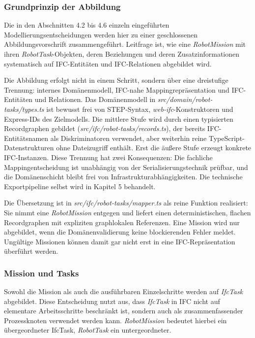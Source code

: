 \subsubsection{Grundprinzip der Abbildung}
Die in den Abschnitten 4.2 bis 4.6 einzeln eingeführten Modellierungsentscheidungen werden hier zu
einer geschlossenen Abbildungsvorschrift zusammengeführt. Leitfrage ist, wie eine
\textit{RobotMission} mit ihren \textit{RobotTask}-Objekten, deren Beziehungen und deren
Zusatzinformationen systematisch auf IFC-Entitäten und IFC-Relationen abgebildet wird.

Die Abbildung erfolgt nicht in einem Schritt, sondern über eine dreistufige Trennung: internes Domänenmodell, IFC-nahe Mappingrepräsentation und IFC-Entitäten und Relationen.
Das Domänenmodell in \textit{src/domain/robot-tasks/types.ts} ist bewusst frei von STEP-Syntax,
\textit{web-ifc}-Konstruktoren und Express-IDs des Zielmodells. Die mittlere Stufe wird durch einen
typisierten Recordgraphen gebildet (\textit{src/ifc/robot-tasks/records.ts}), der bereits
IFC-Entitätsnamen als Diskriminatoren verwendet, aber weiterhin reine TypeScript-Datenstrukturen
ohne Dateizugriff enthält. Erst die äußere Stufe erzeugt konkrete IFC-Instanzen. Diese Trennung hat
zwei Konsequenzen: Die fachliche Mappingentscheidung ist unabhängig von der Serialisierungstechnik
prüfbar, und die Domänenschicht bleibt frei von Infrastrukturabhängigkeiten. Die technische
Exportpipeline selbst wird in Kapitel 5 behandelt.

Die Übersetzung ist in \textit{src/ifc/robot-tasks/mapper.ts} als reine Funktion realisiert: Sie
nimmt eine \textit{RobotMission} entgegen und liefert einen deterministischen, flachen Recordgraphen
mit expliziten graphlokalen Referenzen. Eine Mission wird nur abgebildet, wenn die
Domänenvalidierung keine blockierenden Fehler meldet. Ungültige Missionen können damit gar nicht
erst in eine IFC-Repräsentation überführt werden.

\subsubsection{Mission und Tasks}
Sowohl die Mission als auch die ausführbaren Einzelschritte werden auf \textit{IfcTask} abgebildet.
Diese Entscheidung nutzt aus, dass \textit{IfcTask} in IFC nicht auf elementare Arbeitsschritte
beschränkt ist, sondern auch als zusammenfassender Prozessknoten verwendet werden kann.
\textit{RobotMission} bedeutet hierbei ein übergeordneter IfcTask, \textit{RobotTask} ein untergeordneter.

